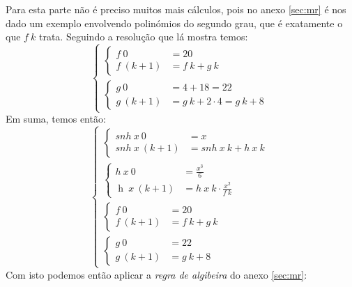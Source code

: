 \documentclass[11pt, a4paper, fleqn]{article}
\DeclareMathOperator{\h}{h}
\begin{document}
Para esta parte não é preciso muitos mais cálculos, pois no anexo \ref{sec:mr} é nos dado um exemplo envolvendo polinómios do segundo grau,
que é exatamente o que $f\ k$ trata. Seguindo a resolução que lá mostra temos:
\[
    \begin{cases}
        \begin{cases}
            f\ 0 &= 20 \\
            f\ (k + 1) &= f\ k + g\ k
        \end{cases} \\
        \begin{cases}
            g\ 0 &= 4 + 18 = 22 \\
            g\ (k + 1) &= g\ k + 2 \cdot 4 = g\ k + 8
        \end{cases}
    \end{cases}
\]
\noindent
Em suma, temos então:
\[
    \begin{cases}
        \begin{cases}
            snh\ x\ 0 &= x \\
            snh\ x\ (k + 1) &= snh\ x\ k + h\ x\ k
        \end{cases} \\
        \begin{cases}
            h\ x\ 0 &= \frac{x^3}{6} \\
            \h\ x\ (k + 1) &= h\ x\ k \cdot \frac{x^{2}}{f\ k}
        \end{cases} \\
        \begin{cases}
            f\ 0 &= 20 \\
            f\ (k + 1) &= f\ k + g\ k
        \end{cases} \\
        \begin{cases}
            g\ 0 &= 22 \\
            g\ (k + 1) &= g\ k + 8
        \end{cases}
    \end{cases}
\]
\noindent
Com isto podemos então aplicar a \emph{regra de algibeira} do anexo \ref{sec:mr}:
\end{document}
